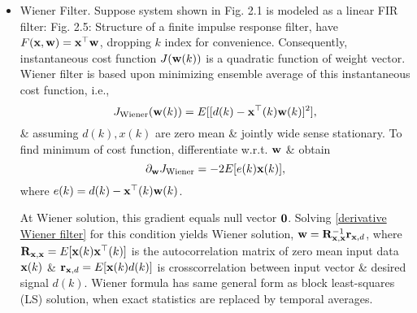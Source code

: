 \documentclass{article}
\begin{document}
\begin{enumerate}
\begin{itemize}
\begin{itemize}
			\begin{itemize}
				\item {\sf Wiener Filter.} Suppose system shown in Fig. 2.1 is modeled as a linear FIR filter: Fig. 2.5: {\sf Structure of a finite impulse response filter}, have $F({\bf x},{\bf w}) = {\bf x}^\top{\bf w}$, dropping $k$ index for convenience. Consequently, instantaneous cost function $J({\bf w}(k))$ is a quadratic function of weight vector. Wiener filter is based upon minimizing ensemble average of this instantaneous cost function, i.e.,
				\begin{equation}
					J_{\rm Wiener}({\bf w}(k)) = E[[d(k) - {\bf x}^\top(k){\bf w}(k)]^2],
				\end{equation}
				\& assuming $d(k),x(k)$ are zero mean \& jointly wide sense stationary. To find minimum of cost function, differentiate w.r.t. ${\bf w}$ \& obtain
				\begin{equation}
					\label{derivative Wiener filter}
					\partial_{\bf w}J_{\rm Wiener} = -2E[e(k){\bf x}(k)],
				\end{equation}
				where $e(k) = d(k) - {\bf x}^\top(k){\bf w}(k)$.
				
				At Wiener solution, this gradient equals null vector ${\bf 0}$. Solving \eqref{derivative Wiener filter} for this condition yields Wiener solution, ${\bf w} = {\bf R}_{{\bf x},{\bf x}}^{-1}{\bf r}_{{\bf x},d}$, where ${\bf R}_{{\bf x},{\bf x}} = E[{\bf x}(k){\bf x}^\top(k)]$ is the autocorrelation matrix of zero mean input data ${\bf x}(k)$ \& ${\bf r}_{{\bf x},d} = E[{\bf x}(k)d(k)]$ is crosscorrelation between input vector \& desired signal $d(k)$. Wiener formula has same general form as block least-squares (LS) solution, when exact statistics are replaced by temporal averages.
				

\end{itemize}
\end{itemize}
\end{itemize}
\end{enumerate}
\end{document}
